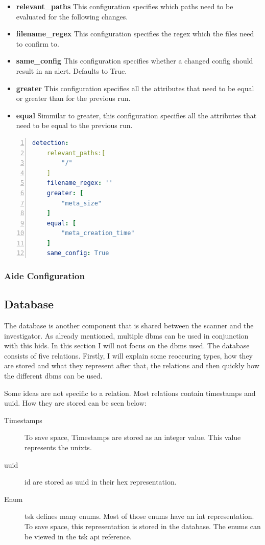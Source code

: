 \documentclass[
	a4paper,					%
	10pt,							%
	twoside,					%
	openright,				%
	notitlepage,			%
	parskip=half,			%
]{scrreprt}					%
\begin{document}
\begin{itemize}
	\item \textbf{relevant\_paths} This configuration specifies which paths need to be evaluated for the following changes. 
	\item \textbf{filename\_regex} This configuration specifies the regex which the files need to confirm to.  
	\item \textbf{same\_config} This configuration specifies whether a changed config should result in an alert. Defaults to True.
	\item \textbf{greater} This configuration specifies all the attributes that need to be equal or greater than for the previous run.
	\item \textbf{equal} Simmilar to greater, this configuration specifies all the attributes that need to be equal to the previous run.
\end{itemize}

\begin{lstlisting}[language=yaml, numbers=left, caption=Investigator Configuration, label=lst:cfg:investigator]
detection:
	relevant_paths:[
		"/"
	]
	filename_regex: ''
	greater: [
		"meta_size"
	]
	equal: [
		"meta_creation_time"
	]
	same_config: True
\end{lstlisting}

\subsubsection{Aide Configuration}
\label{sec:aide:config}



\subsection{Database}
\label{sec:Database}

The database is another component that is shared between the scanner and the investigator. As already mentioned, multiple \gls{dbms} can be used in conjunction with this \gls{hids}. In this section I will not focus on the \gls{dbms} used. The database consists of five relations. Firstly, I will explain some reoccuring types, how they are stored and what they represent after that, the relations and then quickly how the different \gls{dbms} can be used. 

Some ideas are not specific to a relation. Most relations contain timestamps and \gls{uuid}. How they are stored can be seen below:

\begin{description}
	\item [Timestamps] To save space, Timestamps are stored as an integer value. This value represents the \gls{unixts}. 
	\item [\gls{uuid}] \gls{id} are stored as \gls{uuid} in their \gls{hex} representation. 
	\item [Enum] \gls{tsk} defines many enums. Most of those enums have an int representation. To save space, this representation is stored in the database. The enums can be viewed in the \gls{tsk} \gls{api} reference. \cite{tsk:file:header}
\end{description}
\end{document}

